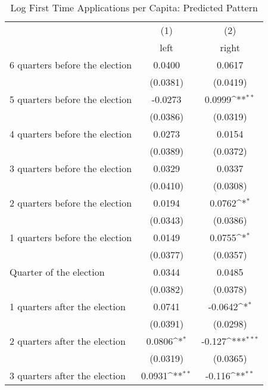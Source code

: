 \begin{table}[htbp]\centering
\def\sym#1{\ifmmode^{#1}\else\(^{#1}\)\fi}
\caption{Log First Time Applications per Capita: Predicted Pattern}
\begin{tabular}{l*{2}{c}}
\hline\hline
                    &\multicolumn{1}{c}{(1)}&\multicolumn{1}{c}{(2)}\\
                    &\multicolumn{1}{c}{left}&\multicolumn{1}{c}{right}\\
\hline
 6 quarters before the election&      0.0400         &      0.0617         \\
                    &    (0.0381)         &    (0.0419)         \\
[1em]
 5 quarters before the election&     -0.0273         &      0.0999\sym{**} \\
                    &    (0.0386)         &    (0.0319)         \\
[1em]
 4 quarters before the election&      0.0273         &      0.0154         \\
                    &    (0.0389)         &    (0.0372)         \\
[1em]
 3 quarters before the election&      0.0329         &      0.0337         \\
                    &    (0.0410)         &    (0.0308)         \\
[1em]
 2 quarters before the election&      0.0194         &      0.0762\sym{*}  \\
                    &    (0.0343)         &    (0.0386)         \\
[1em]
 1 quarters before the election&      0.0149         &      0.0755\sym{*}  \\
                    &    (0.0377)         &    (0.0357)         \\
[1em]
Quarter of the election&      0.0344         &      0.0485         \\
                    &    (0.0382)         &    (0.0378)         \\
[1em]
 1 quarters after the election&      0.0741         &     -0.0642\sym{*}  \\
                    &    (0.0391)         &    (0.0298)         \\
[1em]
 2 quarters after the election&      0.0806\sym{*}  &      -0.127\sym{***}\\
                    &    (0.0319)         &    (0.0365)         \\
[1em]
 3 quarters after the election&      0.0931\sym{**} &      -0.116\sym{**} \\

\end{tabular}
\end{table}
